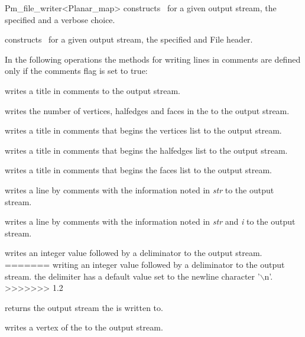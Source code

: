 \begin{ccRefClass}{Pm_file_writer<Planar_map>}
{constructs \ccRefName\ for a given output stream, the specified  and a verbose choice.}

{constructs \ccRefName\ for a given output stream, the specified  and {File header}.}

\ccOperations

In the following operations the methods for writing lines in 
comments are defined only if the comments flag is set to true:

{writes a title in comments to the output stream.}

{writes the number of vertices, halfedges and faces in the  to the output stream.}

{writes a title in comments that begins the vertices list to the output stream.}

{writes a title in comments that begins the halfedges list to the output stream.}

{writes a title in comments that begins the faces list to the output stream.}

{writes a line by comments with the information noted in {\em str} to the output stream.}

{writes a line by comments with the information noted in {\em str} and {\em i} to the output stream.}

{writes an integer value followed by a deliminator to the output stream.}
=======
{writing an integer value followed by a deliminator to the output stream.
 the delimiter has a default value set to the newline character 
 '$\backslash$n'.}
>>>>>>> 1.2

{returns the output stream the  is written to.} 

{writes a vertex of the  to the output stream.}


\end{ccRefClass}
